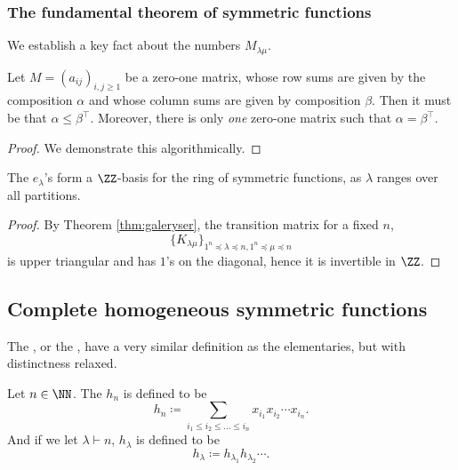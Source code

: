 \documentclass{article}
\begin{document}
\subsubsection{The fundamental theorem of symmetric functions}

We establish a key fact about the numbers $M_{\lambda\mu}$.
\begin{theorem} \label{thm:galeryser} Let $M = (a_{ij})_{i,j \geq 1}$ be a zero-one matrix, whose row sums are given by the composition $\alpha$ and whose column sums are given by composition $\beta$. Then it must be that $\alpha \leq \beta^\top$. Moreover, there is only \textit{one} zero-one matrix such that $\alpha = \beta^\top$.
\end{theorem}

\begin{proof}
    We demonstrate this algorithmically. 
    
\end{proof}

\begin{theorem}
    The $e_\lambda$'s form a $\ZZ$-basis for the ring of symmetric functions, as $\lambda$ ranges over all partitions.
\end{theorem}

\begin{proof}
    By Theorem \ref{thm:galeryser}, the transition matrix for a fixed $n$,
    \[
        \{K_{\lambda\mu}\}_{1^n \preceq \lambda \preceq n, 1^n \preceq \mu \preceq n}
    \]
    is upper triangular and has $1$'s on the diagonal, hence it is invertible in $\ZZ$. 
\end{proof}

\subsection{Complete homogeneous symmetric functions}

The , or the , have a very similar definition as the elementaries, but with distinctness relaxed.

\begin{definition}
    Let $n\in\NN$. The  $h_n$ is defined to be
    \[
        h_n \coloneq \sum_{i_1\leq i_2\leq\ldots\leq i_n} x_{i_1}x_{i_2}\cdots x_{i_n}.
    \]
    And if we let $\lambda \vdash n$, $h_\lambda$ is defined to be
    \[
        h_\lambda \coloneq h_{\lambda_1}h_{\lambda_2}\cdots.
    \]
\end{definition}
\end{document}
